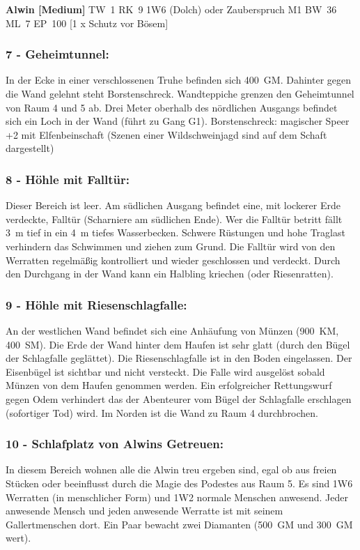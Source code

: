 \textbf{Alwin [Medium]} TW~1 RK~9
1W6 (Dolch) oder Zauberspruch M1 BW~36 ML~7 EP~100 [1 x Schutz vor Bösem]


\subsubsection{7 - Geheimtunnel:} In der Ecke in einer verschlossenen Truhe befinden sich
400~GM. Dahinter gegen die Wand gelehnt steht Borstenschreck. Wandteppiche
grenzen den Geheimtunnel von Raum 4 und 5 ab. Drei Meter oberhalb des nördlichen
Ausgangs befindet sich ein Loch in der Wand (führt zu Gang G1).
Borstenschreck: magischer Speer +2 mit Elfenbeinschaft (Szenen einer
Wildschweinjagd sind auf dem Schaft dargestellt)

\subsubsection{8 - Höhle mit Falltür:} Dieser Bereich ist leer. Am südlichen Ausgang
befindet eine, mit lockerer Erde verdeckte, Falltür (Scharniere am
südlichen Ende). Wer die Falltür betritt fällt 3~m tief in ein 4~m
tiefes Wasserbecken. Schwere Rüstungen und hohe Traglast verhindern das
Schwimmen und ziehen zum Grund.  Die Falltür wird von den Werratten
regelmäßig kontrolliert und wieder geschlossen und verdeckt. Durch
den Durchgang in der Wand kann ein Halbling kriechen (oder Riesenratten).

\subsubsection{9 - Höhle mit Riesenschlagfalle:} An der westlichen Wand befindet sich
eine Anhäufung von Münzen (900~KM, 400~SM). Die Erde der Wand hinter dem
Haufen ist sehr glatt (durch den Bügel der Schlagfalle geglättet). Die
Riesenschlagfalle ist in den Boden eingelassen. Der Eisenbügel ist
sichtbar und nicht versteckt. Die Falle wird ausgelöst sobald Münzen
von dem Haufen genommen werden. Ein erfolgreicher Rettungswurf gegen
Odem verhindert das der Abenteurer vom Bügel der Schlagfalle erschlagen
(sofortiger Tod) wird. Im Norden ist die Wand zu Raum 4 durchbrochen.

\subsubsection{10 - Schlafplatz von Alwins Getreuen:} In diesem Bereich wohnen alle die
Alwin treu ergeben sind, egal ob aus freien Stücken oder beeinflusst
durch die Magie des Podestes aus Raum 5. Es sind 1W6 Werratten (in
menschlicher Form) und 1W2 normale Menschen anwesend. Jeder anwesende
Mensch und jeden anwesende Werratte ist mit seinem Gallertmenschen dort.
Ein Paar bewacht zwei Diamanten (500~GM und 300~GM wert).

